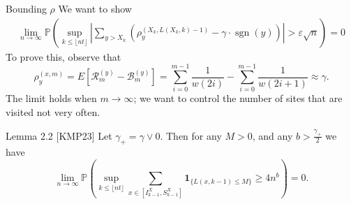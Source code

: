 \documentclass{if-beamer}
\begin{document}
\begin{frame}{Bounding $\rho$}
	We want to show
	\begin{align}
\lim _{n \rightarrow \infty} \mathbb{P}\left(\sup _{k \leq\lfloor n t\rfloor}\left|\sum_{y>X_k}\left(\rho_y^{\left(X_k, L\left(X_k, k\right)-1\right)}-\gamma \cdot \operatorname{sgn}(y)\right)\right|>\varepsilon \sqrt{n}\right)=0
\end{align}
To prove this, observe that
\[
	\rho_y^{(x,m)} = E\left[ \mathcal{R}^{(y)}_m - \mathcal{B}^{(y)}_m \right] = \sum_{i =0}^{m - 1} \frac{1}{w(2 i)} - \sum_{i=0}^{m - 1} \frac{1}{w(2 i + 1)} \approx \gamma
.\] 
The limit holds when $m \to \infty $; we want to control the number of sites that are visited not very often.

\begin{block}{}
	Lemma 2.2 [KMP23] Let $\gamma_{+}=\gamma \vee 0$. Then for any $M>0$, and any $b>\frac{\gamma_{+}}{2}$ we have
\[
\lim _{n \rightarrow \infty} \mathbb{P}\left(\sup _{k \leq\lfloor n t\rfloor} \sum_{x \in\left[I_{k-1}^X, S_{k-1}^X\right]} \mathbf{1}_{\{L(x, k-1) \leq M\}} \geq 4 n^b\right)=0 .
\]
	
\end{block}
\end{frame}
\end{document}
